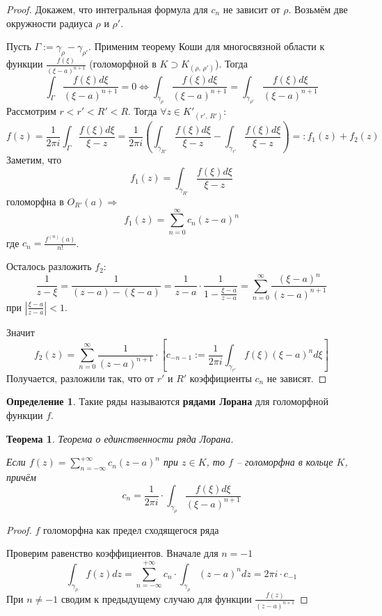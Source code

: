 \documentclass[a4paper,12pt]{article}
\theoremstyle{plain}
\newtheorem{theorem}{Теорема}[section]
\theoremstyle{definition}
\newtheorem{definition}{Определение}[section]
\theoremstyle{remark}
\begin{document}
\begin{proof}
	Докажем, что интегральная формула для $c_n$ не зависит от $\rho$. Возьмём две окружности радиуса $\rho$ и $\rho'$.

	Пусть $\Gamma := \gamma_\rho - \gamma_{\rho'}$. Применим теорему Коши для многосвязной области к функции $\frac{f(\xi)}{(\xi - a)^{n + 1}}$ (голоморфной в $K \supset K_{(\rho,\,\rho')}$). Тогда
	\[
		\int_\Gamma\frac{f(\xi)d\xi}{(\xi - a)^{n + 1}} = 0 \Leftrightarrow \int_{\gamma_\rho}\frac{f(\xi)d\xi}{(\xi - a)^{n + 1}} = \int_{\gamma_{\rho'}}\frac{f(\xi)d\xi}{(\xi - a)^{n + 1}}
	\]
	Рассмотрим $r < r' < R' < R$. Тогда $\forall z \in K'_{(r',\, R')}$:
	\[
		f(z) = \frac{1}{2\pi i}\int_\Gamma\frac{f(\xi)d\xi}{\xi - z} = \frac{1}{2\pi i} \left(\int_{\gamma_{R'}}\frac{f(\xi)d\xi}{\xi - z} - \int_{\gamma_{r'}}\frac{f(\xi)d\xi}{\xi - z}\right) =: f_1(z) + f_2(z)
	\]
	Заметим, что
	\[
		f_1(z) = \int_{\gamma_{R'}}\frac{f(\xi)d\xi}{\xi - z}
	\]
	голоморфна в $O_{R'}(a) \Rightarrow$
	\[
		f_1(z) = \sum_{n = 0}^\infty c_n(z - a)^n
	\]
	где $c_n = \frac{f^{(n)}(a)}{n!}$.

	Осталось разложить $f_2$:
	\[
		\frac{1}{z - \xi} = \frac{1}{(z - a) - (\xi - a)} = \frac{1}{z - a} \cdot\frac{1}{1 - \frac{\xi - a}{z - a}} = \sum_{n = 0}^\infty \frac{(\xi - a)^n}{(z -a)^{n + 1}}
	\]
	при $\left\vert\frac{\xi - a}{z - a}\right\vert < 1$.

	Значит
	\[
		f_2(z) = \sum_{n = 0}^\infty \frac{1}{(z - a)^{n + 1}}\cdot\left[c_{-n - 1} := \frac{1}{2\pi i}\int_{\gamma_{r'}}f(\xi)(\xi - a)^nd\xi \right]
	\]
	Получается, разложили так, что от $r'$ и $R'$ коэффициенты $c_n$ не зависят.
\end{proof}

\begin{definition}
	Такие ряды называются \textbf{рядами Лорана} для голоморфной функции $f$.
\end{definition}

\begin{theorem}
	Теорема о единственности ряда Лорана.

	Если $f(z) = \sum_{n = -\infty}^{+\infty}c_n(z - a)^n$ при $z \in K$, то $f$ -- голоморфна в кольце $K$, причём
	\[
		c_n = \frac{1}{2\pi i}\cdot\int_{\gamma_\rho}\frac{f(\xi)d\xi}{(\xi - a)^{n + 1}}
	\]
\end{theorem}

\begin{proof}
	$f$ голоморфна как предел сходящегося ряда

	Проверим равенство коэффициентов. Вначале для $n = -1$
	\[
		\int_{\gamma_\rho} f(z)dz = \sum_{n = -\infty}^{+\infty} c_n\cdot\int_{\gamma_\rho}(z - a)^ndz = 2\pi i\cdot c_{-1}
	\]
	При $n \neq -1$ сводим к предыдущему случаю для функции $\frac{f(z)}{(z - a)^{n + 1}}$
\end{proof}
\end{document}
